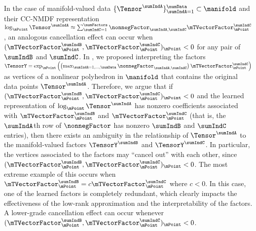 In the case of manifold-valued data $\{\Tensor^\sumIndA\}_{\sumIndA=1}^\numData \subset \manifold$ and their CC-NMDF representation $\log_\mPoint \Tensor^\sumIndA \approx \sum_{\sumIndC=1}^\numFactors \nonnegFactor_{\sumIndA, \sumIndC} \mTVectorFactor_\mPoint^\sumIndC$, an analogous cancellation effect can occur when $(\mTVectorFactor_\mPoint^\sumIndB, \mTVectorFactor_\mPoint^\sumIndC)_\mPoint < 0$ for any pair of $\sumIndB$ and $\sumIndC$. In , we proposed interpreting the factors $\TensorY = \exp_\mPoint \left ( \left (\max_{\sumIndA = 1, \dots, \numData} \nonnegFactor_{\sumIndA,\sumIndC}\right) \mTVectorFactor_\mPoint ^\sumIndC\right )$ as vertices of a nonlinear polyhedron in $\manifold$ that contains the original data points $\Tensor^\sumIndA$. Therefore, we argue that if $(\mTVectorFactor_\mPoint^\sumIndB, \mTVectorFactor_\mPoint^\sumIndC)_\mPoint < 0$ and the learned representation of $\log_\mPoint \Tensor^\sumIndA$ has nonzero coefficients associated with $\mTVectorFactor_\mPoint^\sumIndB$ and $\mTVectorFactor_\mPoint^\sumIndC$ (that is, the $\sumIndA$th row of $\nonnegFactor$ has nonzero $\sumIndB$ and $\sumIndC$ entries), then there exists an ambiguity in the relationship of $\Tensor^\sumIndA$ to the manifold-valued factors $\TensorY^\sumIndB$ and $\TensorY^\sumIndC$. In particular, the vertices associated to the factors may ``cancel out'' with each other, since $(\mTVectorFactor_\mPoint^\sumIndB, \mTVectorFactor_\mPoint^\sumIndC)_\mPoint < 0$. The most extreme example of this occurs when $\mTVectorFactor_\mPoint^\sumIndB = c \mTVectorFactor_\mPoint^\sumIndC$ where $c < 0$. In this case, one of the learned factors is completely redundant, which clearly impacts the effectiveness of the low-rank approximation and the interpretability of the factors. A lower-grade cancellation effect can occur whenever $(\mTVectorFactor_\mPoint^\sumIndB, \mTVectorFactor_\mPoint^\sumIndC)_\mPoint < 0$.

